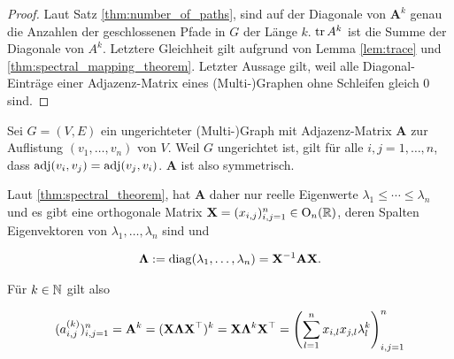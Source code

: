             \begin{proof}

                Laut Satz \ref{thm:number_of_paths}, sind auf der Diagonale von $\mathbf A^k$ genau die Anzahlen der geschlossenen Pfade in $G$ der Länge $k$.
                $\operatorname{tr} A^k$ ist die Summe der Diagonale von $A^k$.
                Letztere Gleichheit gilt aufgrund von Lemma \ref{lem:trace} und \ref{thm:spectral_mapping_theorem}.
                Letzter Aussage gilt, weil alle Diagonal-Einträge einer Adjazenz-Matrix eines (Multi-)Graphen ohne Schleifen gleich $0$ sind.

            \end{proof}

            \begin{remark} \label{rem:number_of_paths_undirected}

                Sei $G = (V, E)$ ein ungerichteter (Multi-)Graph mit Adjazenz-Matrix $\mathbf A$ zur Auflistung $(v_1, \dots, v_n)$ von $V$.
                Weil $G$ ungerichtet ist, gilt für alle $i, j = 1, \dots, n$, dass $\operatorname{adj}(v_i, v_j) = \operatorname{adj}(v_j, v_i)$.
                $\mathbf A$ ist also symmetrisch.

                Laut \ref{thm:spectral_theorem}, hat $\mathbf A$ daher nur reelle Eigenwerte $\lambda_1 \leq \cdots \leq \lambda_n$ und es gibt eine orthogonale Matrix $\mathbf X = (x_{i,j})_{i,j=1}^n \in \operatorname O_n(\mathbb R)$, deren Spalten Eigenvektoren von $\lambda_1, \dots, \lambda_n$ sind und

                \begin{align*}
                    \mathbf \Lambda
                    :=
                    \operatorname{diag}(\lambda_1, \dots, \lambda_n)
                    =
                    \mathbf X^{-1} \mathbf A \mathbf X.
                \end{align*}

                Für $k \in \mathbb N$ gilt also

                \begin{align*}
                    (a_{i,j}^{(k)})_{i,j=1}^n
                    =
                    \mathbf A^k
                    =
                    (\mathbf X \mathbf \Lambda \mathbf X^\top)^k
                    =
                    \mathbf X \mathbf \Lambda^k \mathbf X^\top
                    =
                    {\left ( 
                        \sum_{l=1}^n
                            x_{i,l} x_{j,l} \lambda_l^k
                     \right )}_{i,j=1}^n
                \end{align*}


\end{remark}
